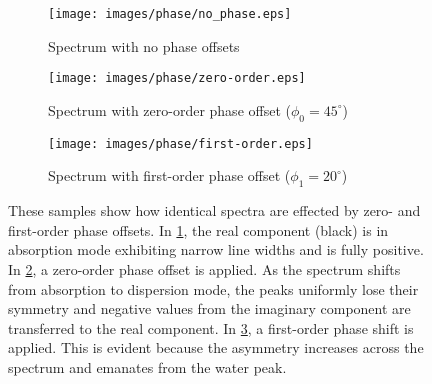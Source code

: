 \begin{figure}
    \centering
    \begin{subfigure}{0.32\textwidth}
        \centering
        \texttt{[image: images/phase/no\_phase.eps]}
        \caption{Spectrum with no phase offsets}
        \label{subfig:no phase}        
    \end{subfigure}
    \begin{subfigure}{0.32\textwidth}
        \centering
        \texttt{[image: images/phase/zero-order.eps]}
        \caption{Spectrum with zero-order phase offset ($\phi_0 = 45^{\circ}$)}
        \label{subfig:zero order phase}        
    \end{subfigure}
    \begin{subfigure}{0.32\textwidth}
        \centering
        \texttt{[image: images/phase/first-order.eps]}
        \caption{Spectrum with first-order phase offset ($\phi_1 = 20^{\circ}$)}
        \label{subfig:first order phase}        
    \end{subfigure}
    \caption{These samples show how identical spectra are effected by zero- and first-order phase offsets. In \ref{subfig:no phase}, the real component (black) is in absorption mode exhibiting narrow line widths and is fully positive. In \ref{subfig:zero order phase}, a zero-order phase offset is applied. As the spectrum shifts from absorption to dispersion mode, the peaks uniformly lose their symmetry and negative values from the imaginary component are transferred to the real component. In \ref{subfig:first order phase}, a first-order phase shift is applied. This is evident because the asymmetry increases across the spectrum and emanates from the water peak.}
    \label{fig:phase effects}
\end{figure}